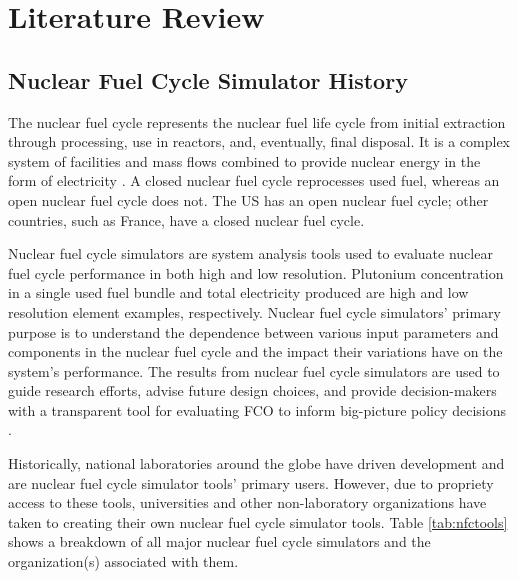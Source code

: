 \chapter{Literature Review}

\section{Nuclear Fuel Cycle Simulator History}
The nuclear fuel cycle represents the nuclear fuel life cycle from initial
extraction through processing, use in reactors, and, eventually, 
final disposal.
It is a complex system of facilities and mass flows 
combined to provide nuclear energy 
in the form of electricity \cite{yacout_modeling_2005}.
A closed nuclear fuel cycle reprocesses used fuel, whereas an open 
nuclear fuel cycle does not.  
The US has an open nuclear fuel cycle; other countries, such as France, 
have a closed nuclear fuel cycle. 

Nuclear fuel cycle simulators are system analysis tools used to evaluate 
nuclear fuel cycle performance in both high and low resolution. 
Plutonium concentration in a single used fuel bundle and 
total electricity produced are high and low 
resolution element examples, respectively.
Nuclear fuel cycle simulators' primary purpose   
is to understand the dependence between various input parameters and components 
in the nuclear fuel cycle and the impact their variations have on 
the system's performance. 
The results from nuclear fuel cycle simulators are used to guide research 
efforts, advise future design choices, and provide 
decision-makers with a transparent tool for evaluating \gls{FCO} 
to inform big-picture policy decisions \cite{yacout_modeling_2005}.

Historically, national laboratories around the globe have driven 
development and are nuclear fuel cycle simulator tools' primary users. 
However, due to propriety access to these tools, universities and 
other non-laboratory organizations have taken to creating their 
own nuclear fuel cycle simulator tools. 
Table \ref{tab:nfctools} shows a breakdown of all major nuclear fuel cycle simulators
and the organization(s) associated with them.  


